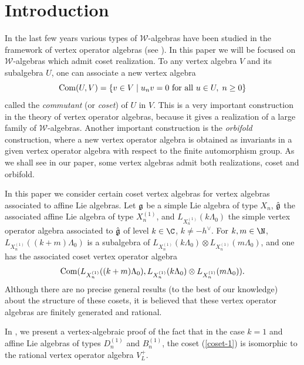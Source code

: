 \documentclass[pdftex]{sigma}
\begin{document}



\section{Introduction}


In the last few years various types of $\mathcal{W}$-algebras have
been studied in the framework of vertex operator algebras (see
\cite{AdM-aim, AdM-cmp,Ar, DLY,KWak}).
In this paper we will be focused on ${\mathcal W}$-algebras which
admit coset realization. To any vertex algebra $V$ and its
subalgebra $U$, one can associate a new vertex algebra
\[ {\rm Com}(U,V)= \{ v \in V \; | \; u_n v =0 \mbox{ for all } u \in
U, \; n \geq 0 \}   \]
called the {\it commutant} (or {\it coset}) of $U$ in $V$. This is a
very important construction in the theory of vertex operator
algebras, because it gives a realization of a large family of
${\mathcal W}$-algebras.  Another important construction is the
{\it orbifold} construction, where a new vertex operator algebra is
obtained as invariants in a given vertex operator algebra with
respect to the f\/inite automorphism group. As we shall see in our
paper, some vertex algebras admit both realizations, coset and
orbifold.

In this paper we consider certain coset vertex algebras for vertex
algebras associated to af\/f\/ine Lie algebras. Let ${\frak g}$ be a
simple Lie algebra of type $X_{n}$, $\hat{\frak g}$ the associated
af\/f\/ine Lie algebra of type $X_{n}^{(1)}$, and $L_{X_{n}^{(1)}}(k
\Lambda _0)$ the simple vertex operator algebra associated to
$\hat{\frak g}$ of level $k \in \C$, $k \neq - h^{\vee}$. For $k,m
\in \N$, $L_{X_{n}^{(1)}}((k+m) \Lambda _0)$ is a subalgebra of
$L_{X_{n}^{(1)}}(k \Lambda _0) \otimes L_{X_{n}^{(1)}}(m \Lambda
_0)$, and one has the associated coset vertex operator algebra
\begin{gather} \label{coset-1}   {\rm Com}(L_{X_{n}^{(1)}}((k+m)
\Lambda _0) , L_{X_{n}^{(1)}}(k \Lambda _0) \otimes
L_{X_{n}^{(1)}}(m \Lambda _0)).
\end{gather}
Although there are no
precise general results (to the best of our knowledge) about the
structure of these cosets, it is believed that these vertex operator
algebras are f\/initely generated and rational.

In \cite{AP-2010},  we present a vertex-algebraic proof of the fact that  in  the case $k=1$ and af\/f\/ine Lie algebras of types $D_n ^{(1)}$ and $B_{n} ^{(1)}$,
  the coset (\ref{coset-1})  is isomorphic to the rational vertex operator algebra $V_L ^{+}$.
\end{document}
